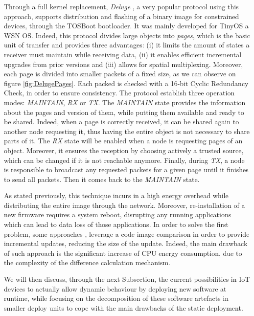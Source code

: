 Through a full kernel replacement, \textit{Deluge} \cite{hui2004dynamic}, a very popular protocol using this approach, supports distribution and flashing of a binary image for constrained devices, through the TOSBoot bootloader.
It was mainly developed for TinyOS \cite{levis2005tinyos} a WSN OS.
Indeed, this protocol divides large objects into \textit{pages}, which is the basic unit of transfer and provides three advantages: (i) it limits the amount of states a receiver must maintain while receiving data, (ii) it enables efficient incremental upgrades from prior versions and (iii) allows for spatial multiplexing.
Moreover, each page is divided into smaller packets of a fixed size, as we can observe on figure \ref{fig:DelugePages}.
Each packed is checked with a 16-bit Cyclic Redundancy Check, in order to ensure consistency.
The protocol establish three operation modes: \textit{MAINTAIN}, \textit{RX} or \textit{TX}.
The \textit{MAINTAIN} state provides the information about the pages and version of them, while putting them available and ready to be shared.
Indeed, when a page is correctly received, it can be shared again to another node requesting it, thus having the entire object is not necessary to share parts of it.
The \textit{RX} state will be enabled when a node is requesting pages of an object.
Moreover, it ensures the reception by choosing actively a trusted source, which can be changed if it is not reachable anymore.
Finally, during \textit{TX}, a node is responsible to broadcast any requested packets for a given page until it finishes to send all packets.
Then it comes back to the \textit{MAINTAIN} state.

As stated previously, this technique incurs in a high energy overhead while distributing the entire image through the network.
Moreover, re-installation of a new firmware requires a system reboot, disrupting any running applications which can lead to data loss of those applications.
In order to solve the first problem, some approaches  \cite{jeong2004incremental},  \cite{reijers2003efficient} leverage a code image comparison in order to provide incremental updates, reducing the size of the update.
Indeed, the main drawback of such approach is the significant increase of CPU energy consumption, due to the complexity of the difference calculation mechanism.

We will then discuss, through the next Subsection, the current possibilities in IoT devices to actually allow dynamic behaviour by deploying new software at runtime, while focusing on the decomposition of these software artefacts in smaller deploy units to cope with the main drawbacks of the static deployment.

